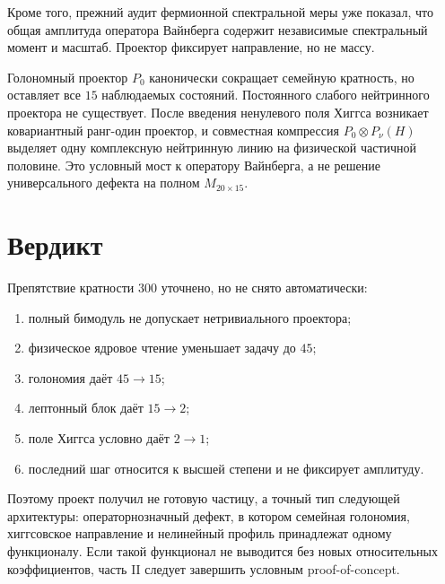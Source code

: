 Кроме того, прежний аудит фермионной спектральной меры уже показал, что
общая амплитуда оператора Вайнберга содержит независимые спектральный
момент и масштаб. Проектор фиксирует направление, но не массу.

\begin{theorem}
Голономный проектор $P_0$ канонически сокращает семейную кратность, но
оставляет все $15$ наблюдаемых состояний. Постоянного слабого нейтринного
проектора не существует. После введения ненулевого поля Хиггса возникает
ковариантный ранг-один проектор, и совместная компрессия
$P_0\otimes P_\nu(H)$ выделяет одну комплексную нейтринную линию на
физической частичной половине. Это условный мост к оператору Вайнберга, а
не решение универсального дефекта на полном $M_{20\times15}$.
\end{theorem}

\section{Вердикт}

Препятствие кратности $300$ уточнено, но не снято автоматически:
\begin{enumerate}
 \item полный бимодуль не допускает нетривиального проектора;
 \item физическое ядровое чтение уменьшает задачу до $45$;
 \item голономия даёт $45\to15$;
 \item лептонный блок даёт $15\to2$;
 \item поле Хиггса условно даёт $2\to1$;
 \item последний шаг относится к высшей степени и не фиксирует амплитуду.
\end{enumerate}

Поэтому проект получил не готовую частицу, а точный тип следующей
архитектуры: операторнозначный дефект, в котором семейная голономия,
хиггсовское направление и нелинейный профиль принадлежат одному
функционалу. Если такой функционал не выводится без новых относительных
коэффициентов, часть II следует завершить условным proof-of-concept.

